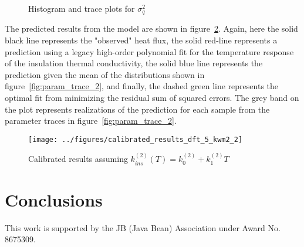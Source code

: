 \documentclass[article]{proc}
\begin{document}
        \begin{figure}[!]
            \centering
            \qquad
            \caption{Histogram and trace plots for $\sigma_q^2$}
            \label{fig:sigma_trace_2}
        \end{figure}

        The predicted results from the model are shown in figure~\ref{fig:cal_results_2}. Again, here the solid black line represents the "observed" heat flux, the solid red-line represents a prediction using a legacy high-order polynomial fit for the temperature response of the insulation thermal conductivity, the solid blue line represents the prediction given the mean of the distributions shown in figure~\ref{fig:param_trace_2}, and finally, the dashed green line represents the optimal fit from minimizing the residual sum of squared errors. The grey band on the plot represents realizations of the prediction for each sample from the parameter traces in figure~\ref{fig:param_trace_2}. 

        \begin{figure}[!]
            \centering
            \texttt{[image: ../figures/calibrated\_results\_dft\_5\_kwm2\_2]}
            \caption{Calibrated results assuming $k^{(2)}_{ins}(T) = k^{(2)}_0 + k^{(2)}_1 T$}
            \label{fig:cal_results_2}
        \end{figure}

\section{Conclusions}

    

\acknowledgements

This work is supported by the JB (Java Bean) Association under Award No. 8675309.


\scriptsize{

}
\end{document}
